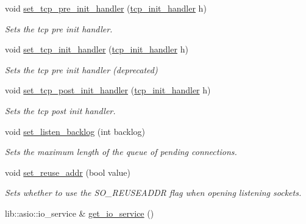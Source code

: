 \begin{DoxyCompactItemize}
void \hyperlink{classwebsocketpp_1_1transport_1_1asio_1_1endpoint_ad334b214cf4800bb34aa09d7055e6464}{set\+\_\+tcp\+\_\+pre\+\_\+init\+\_\+handler} (\hyperlink{namespacewebsocketpp_1_1transport_1_1asio_ad12345b8638872037c87db068467233d}{tcp\+\_\+init\+\_\+handler} h)
\begin{DoxyCompactList}\small\item\em Sets the tcp pre init handler. \end{DoxyCompactList}\item 
void \hyperlink{classwebsocketpp_1_1transport_1_1asio_1_1endpoint_a497f353a5ec277355cd8b0caf893d1ce}{set\+\_\+tcp\+\_\+init\+\_\+handler} (\hyperlink{namespacewebsocketpp_1_1transport_1_1asio_ad12345b8638872037c87db068467233d}{tcp\+\_\+init\+\_\+handler} h)
\begin{DoxyCompactList}\small\item\em Sets the tcp pre init handler (deprecated) \end{DoxyCompactList}\item 
void \hyperlink{classwebsocketpp_1_1transport_1_1asio_1_1endpoint_a605c9f8c671d783739c1e98c6c7fda9d}{set\+\_\+tcp\+\_\+post\+\_\+init\+\_\+handler} (\hyperlink{namespacewebsocketpp_1_1transport_1_1asio_ad12345b8638872037c87db068467233d}{tcp\+\_\+init\+\_\+handler} h)
\begin{DoxyCompactList}\small\item\em Sets the tcp post init handler. \end{DoxyCompactList}\item 
void \hyperlink{classwebsocketpp_1_1transport_1_1asio_1_1endpoint_a60bb0d01c277b7cfcb6f69215a36b216}{set\+\_\+listen\+\_\+backlog} (int backlog)
\begin{DoxyCompactList}\small\item\em Sets the maximum length of the queue of pending connections. \end{DoxyCompactList}\item 
void \hyperlink{classwebsocketpp_1_1transport_1_1asio_1_1endpoint_a491d13d6e1ad0edc5843e41b06fa4e0c}{set\+\_\+reuse\+\_\+addr} (bool value)
\begin{DoxyCompactList}\small\item\em Sets whether to use the S\+O\+\_\+\+R\+E\+U\+S\+E\+A\+D\+D\+R flag when opening listening sockets. \end{DoxyCompactList}\item 
lib\+::asio\+::io\+\_\+service \& \hyperlink{classwebsocketpp_1_1transport_1_1asio_1_1endpoint_a97efb3c1915ae8cc38ef92ff9514ebd4}{get\+\_\+io\+\_\+service} ()

\end{DoxyCompactItemize}
